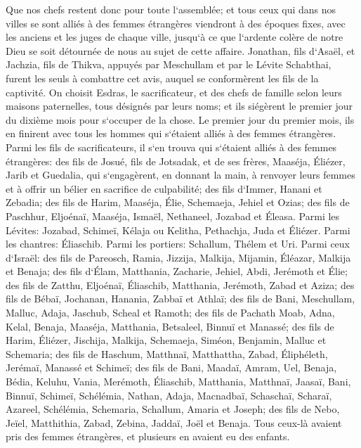 \verse Que nos chefs restent donc pour toute l`assemblée; et tous ceux qui dans nos villes se sont alliés à des femmes étrangères viendront à des époques fixes, avec les anciens et les juges de chaque ville, jusqu`à ce que l`ardente colère de notre Dieu se soit détournée de nous au sujet de cette affaire. 
\verse Jonathan, fils d`Asaël, et Jachzia, fils de Thikva, appuyés par Meschullam et par le Lévite Schabthai, furent les seuls à combattre cet avis, 
\verse auquel se conformèrent les fils de la captivité. On choisit Esdras, le sacrificateur, et des chefs de famille selon leurs maisons paternelles, tous désignés par leurs noms; et ils siégèrent le premier jour du dixième mois pour s`occuper de la chose. 
\verse Le premier jour du premier mois, ils en finirent avec tous les hommes qui s`étaient alliés à des femmes étrangères. 
\verse Parmi les fils de sacrificateurs, il s`en trouva qui s`étaient alliés à des femmes étrangères: des fils de Josué, fils de Jotsadak, et de ses frères, Maaséja, Éliézer, Jarib et Guedalia, 
\verse qui s`engagèrent, en donnant la main, à renvoyer leurs femmes et à offrir un bélier en sacrifice de culpabilité; 
\verse des fils d`Immer, Hanani et Zebadia; 
\verse des fils de Harim, Maaséja, Élie, Schemaeja, Jehiel et Ozias; 
\verse des fils de Paschhur, Eljoénaï, Maaséja, Ismaël, Nethaneel, Jozabad et Éleasa. 
\verse Parmi les Lévites: Jozabad, Schimeï, Kélaja ou Kelitha, Pethachja, Juda et Éliézer. 
\verse Parmi les chantres: Éliaschib. Parmi les portiers: Schallum, Thélem et Uri. 
\verse Parmi ceux d`Israël: des fils de Pareosch, Ramia, Jizzija, Malkija, Mijamin, Éléazar, Malkija et Benaja; 
\verse des fils d`Élam, Matthania, Zacharie, Jehiel, Abdi, Jerémoth et Élie; 
\verse des fils de Zatthu, Eljoénaï, Éliaschib, Matthania, Jerémoth, Zabad et Aziza; 
\verse des fils de Bébaï, Jochanan, Hanania, Zabbaï et Athlaï; 
\verse des fils de Bani, Meschullam, Malluc, Adaja, Jaschub, Scheal et Ramoth; 
\verse des fils de Pachath Moab, Adna, Kelal, Benaja, Maaséja, Matthania, Betsaleel, Binnuï et Manassé; 
\verse des fils de Harim, Éliézer, Jischija, Malkija, Schemaeja, Siméon, 
\verse Benjamin, Malluc et Schemaria; 
\verse des fils de Haschum, Matthnaï, Matthattha, Zabad, Éliphéleth, Jerémaï, Manassé et Schimeï; 
\verse des fils de Bani, Maadaï, Amram, Uel, 
\verse Benaja, Bédia, Keluhu, 
\verse Vania, Merémoth, Éliaschib, 
\verse Matthania, Matthnaï, Jaasaï, 
\verse Bani, Binnuï, Schimeï, 
\verse Schélémia, Nathan, Adaja, 
\verse Macnadbaï, Schaschaï, Scharaï, 
\verse Azareel, Schélémia, Schemaria, 
\verse Schallum, Amaria et Joseph; 
\verse des fils de Nebo, Jeïel, Matthithia, Zabad, Zebina, Jaddaï, Joël et Benaja. 
\verse Tous ceux-là avaient pris des femmes étrangères, et plusieurs en avaient eu des enfants. 

